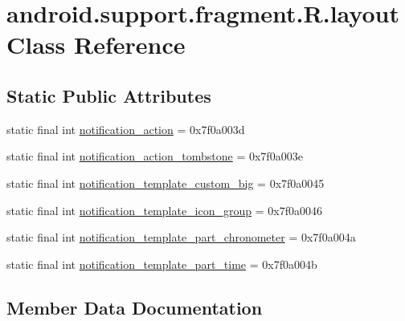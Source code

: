 \hypertarget{classandroid_1_1support_1_1fragment_1_1R_1_1layout}{}\section{android.\+support.\+fragment.\+R.\+layout Class Reference}
\label{classandroid_1_1support_1_1fragment_1_1R_1_1layout}
\subsection*{Static Public Attributes}
\begin{DoxyCompactItemize}
\item 
static final int \mbox{\hyperlink{classandroid_1_1support_1_1fragment_1_1R_1_1layout_a791e08fcdc9e05bf963845223d181b0c}{notification\+\_\+action}} = 0x7f0a003d
\item 
static final int \mbox{\hyperlink{classandroid_1_1support_1_1fragment_1_1R_1_1layout_a7d7b44c89af4927392573ce34e0ea1c9}{notification\+\_\+action\+\_\+tombstone}} = 0x7f0a003e
\item 
static final int \mbox{\hyperlink{classandroid_1_1support_1_1fragment_1_1R_1_1layout_a13f474722b247fdd643e2d8604afd5aa}{notification\+\_\+template\+\_\+custom\+\_\+big}} = 0x7f0a0045
\item 
static final int \mbox{\hyperlink{classandroid_1_1support_1_1fragment_1_1R_1_1layout_ae5a01afc8b1457fcb8e7ca7cb5b12ad6}{notification\+\_\+template\+\_\+icon\+\_\+group}} = 0x7f0a0046
\item 
static final int \mbox{\hyperlink{classandroid_1_1support_1_1fragment_1_1R_1_1layout_a9d448ba0d8e460da8ea06572ca6f0816}{notification\+\_\+template\+\_\+part\+\_\+chronometer}} = 0x7f0a004a
\item 
static final int \mbox{\hyperlink{classandroid_1_1support_1_1fragment_1_1R_1_1layout_ad29861bef0147e4d35f5e9b0575e5ed5}{notification\+\_\+template\+\_\+part\+\_\+time}} = 0x7f0a004b
\end{DoxyCompactItemize}


\subsection{Member Data Documentation}
\mbox{\label{classandroid_1_1support_1_1fragment_1_1R_1_1layout_a791e08fcdc9e05bf963845223d181b0c}} 
